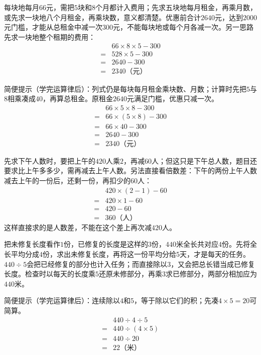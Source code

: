 \documentclass[multi=snippet,border=0pt]{standalone}
\newenvironment{snippet}[3]{\begin{minipage}{#1bp}\color{answerred}\fontsize{#2}{#3}\selectfont\raggedright}{\end{minipage}}
\begin{document}
\begin{snippet}{505}{11.5}{14}每块地每月\(66\)元，需把\(5\)块和\(8\)个月都计入费用；先求五块地每月租金，再乘月数，或先求一块地八个月租金，再乘块数，意义都清楚。优惠前合计\(2640\)元，达到\(2000\)元门槛，才能从总租金中减一次\(300\)元，不能每块地或每个月各减一次。另一思路先求一块地整个租期的费用：\[\begin{aligned}&66\times8\times5-300\\={}&528\times5-300\\={}&2640-300\\={}&2340\text{（元）}\end{aligned}\]\par 简便提示（学完运算律后）：列式仍是每块每月租金乘块数、月数；计算时先把\(5\)与\(8\)相乘凑成\(40\)，再算总租金。原租金\(2640\)元满足门槛，优惠只减一次。\[\begin{aligned}&66\times5\times8-300\\={}&66\times(5\times8)-300\\={}&66\times40-300\\={}&2640-300\\={}&2340\text{（元）}\end{aligned}\]\end{snippet}
\begin{snippet}{505}{11.5}{14}先求下午人数时，要把上午的\(420\)人乘\(2\)，再减\(60\)人；但这只是下午总人数，题目还要求比上午多多少，需再减去上午人数。另法直接看倍数差：下午的两份上午人数减去上午的一份后，还剩一份，再扣少的\(60\)人：\[\begin{aligned}&420\times(2-1)-60\\={}&420\times1-60\\={}&420-60\\={}&360\text{（人）}\end{aligned}\]这样直接求的是人数差，不能在这个差上再次减\(420\)人。\end{snippet}
\begin{snippet}{505}{11.5}{14}把未修复长度看作\(1\)份，已修复的长度是这样的\(3\)份，\(440\)米全长共对应\(4\)份。先将全长平均分成\(4\)份，求出未修复长度，再将这一份平均分给\(5\)天，才是每天的任务。\(440\div5\)会把已经修复的部分也计入任务；而直接除以\(3\)，又会把总长错当成已修复长度。检查时以每天的长度乘\(5\)还原未修部分，再乘\(3\)求已修部分，两部分相加应为\(440\)米。\par 简便提示（学完运算律后）：连续除以\(4\)和\(5\)，等于除以它们的积；先凑\(4\times5=20\)可简算。\[\begin{aligned}&440\div4\div5\\={}&440\div(4\times5)\\={}&440\div20\\={}&22\text{（米）}\end{aligned}\]\end{snippet}
\end{document}
